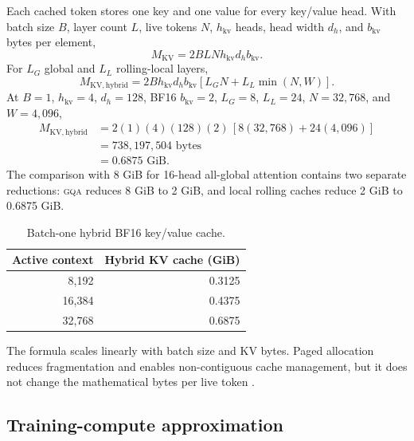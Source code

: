 \documentclass[10pt,letterpaper]{article}
\newcommand{\abbr}[1]{\textsc{\MakeLowercase{#1}}}
\newcommand{\1}{\mathbb{1}}
\begin{document}
Each cached token stores one key and one value for every key/value head.  With batch size $B$, layer
count $L$, live tokens $N$, $h_{\mathrm{kv}}$ heads, head width $d_h$, and $b_{\mathrm{kv}}$ bytes per
element,
\begin{equation}
  M_{\mathrm{KV}}
  =2BLNh_{\mathrm{kv}}d_hb_{\mathrm{kv}}.
  \label{eq:kv-general}
\end{equation}
For $L_G$ global and $L_L$ rolling-local layers,
\begin{equation}
  M_{\mathrm{KV,hybrid}}
  =2Bh_{\mathrm{kv}}d_hb_{\mathrm{kv}}
   \left[L_GN+L_L\min(N,W)\right].
  \label{eq:kv-hybrid}
\end{equation}
At $B=1$, $h_{\mathrm{kv}}=4$, $d_h=128$, BF16 $b_{\mathrm{kv}}=2$, $L_G=8$,
$L_L=24$, $N=32{,}768$, and $W=4{,}096$,
\begin{align}
  M_{\mathrm{KV,hybrid}}
  &=2(1)(4)(128)(2)\,[8(32{,}768)+24(4{,}096)]\\
  &=738{,}197{,}504\text{ bytes}\\
  &=0.6875\text{ GiB}.
  \label{eq:kv-numeric}
\end{align}
The comparison with 8 GiB for 16-head all-global attention contains two separate reductions:
\abbr{GQA} reduces 8 GiB to 2 GiB, and local rolling caches reduce 2 GiB to 0.6875 GiB.

\begin{table}[h]
\centering
\caption{Batch-one hybrid BF16 key/value cache.}
\label{tab:kv-cache}
\small
\begin{tabular}{@{}rr@{}}
\toprule Active context & Hybrid KV cache (GiB) \\
\midrule
8,192 & 0.3125 \\
16,384 & 0.4375 \\
32,768 & 0.6875 \\
\bottomrule
\end{tabular}
\end{table}
The formula scales linearly with batch size and KV bytes.  Paged allocation reduces fragmentation and
enables non-contiguous cache management, but it does not change the mathematical bytes per live token
\cite{kwon2023pagedattention}.

\subsection{Training-compute approximation}
\end{document}
